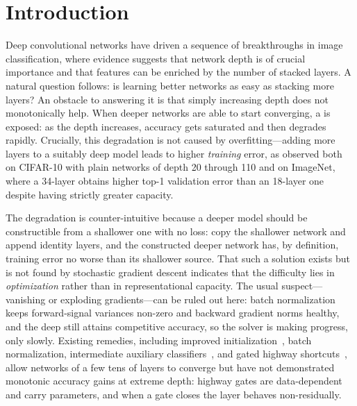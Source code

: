 \section{Introduction}
\label{sec:intro}

Deep convolutional networks have driven a sequence of breakthroughs in image
classification, where evidence suggests that network depth is of crucial importance and
that features can be enriched by the number of stacked layers. A natural question
follows: is learning better networks as easy as stacking more layers? An obstacle to
answering it is that simply increasing depth does not monotonically help. When deeper
networks are able to start converging, a \degprob is exposed: as the depth increases,
accuracy gets saturated and then degrades rapidly. Crucially, this degradation is not
caused by overfitting---adding more layers to a suitably deep model leads to higher
\emph{training} error, as observed both on CIFAR-10 with plain networks of depth 20
through 110 and on ImageNet, where a 34-layer \plainnet obtains higher top-1 validation
error than an 18-layer one despite having strictly greater capacity.

The degradation is counter-intuitive because a deeper model should be constructible from
a shallower one with no loss: copy the shallower network and append identity layers, and
the constructed deeper network has, by definition, training error no worse than its
shallower source. That such a solution exists but is not found by stochastic gradient
descent indicates that the difficulty lies in \emph{optimization} rather than in
representational capacity. The usual suspect---vanishing or exploding
gradients---can be ruled out here: batch normalization~\citep{ioffe2015batchnorm} keeps
forward-signal variances non-zero and backward gradient norms healthy, and the deep
\plainnet still attains competitive accuracy, so the solver is making progress, only
slowly. Existing remedies, including improved initialization~\citep{glorot2010xavier,he2015prelu},
batch normalization, intermediate auxiliary classifiers~\citep{lee2014dsn}, and gated
highway shortcuts~\citep{srivastava2015highway,srivastava2015trainingverydeep}, allow
networks of a few tens of layers to converge but have not demonstrated monotonic
accuracy gains at extreme depth: highway gates are data-dependent and carry parameters,
and when a gate closes the layer behaves non-residually.

